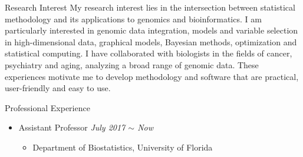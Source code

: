 \documentclass{resume} %
\begin{document}
\begin{rSection}{Research Interest}
My research interest lies in the intersection between statistical methodology and its applications to genomics and bioinformatics.	
I am particularly interested in genomic data integration, models and variable selection in high-dimensional data, graphical models, Bayesian methods, optimization and statistical computing. 
I have collaborated with biologists in the fields of cancer, psychiatry and aging, analyzing a broad range of genomic data. 
These experiences motivate me to develop methodology and software that are practical, user-friendly and easy to use.
\end{rSection}

\begin{rSection}{Professional Experience}
\begin{itemize}[noitemsep,topsep=0pt]

\item Assistant Professor
        \hfill {\em July 2017 $\sim$ Now} 
        \begin{itemize}
        \item Department of Biostatistics, University of Florida
        \end{itemize}
\end{itemize}
\end{rSection}
\end{document}

